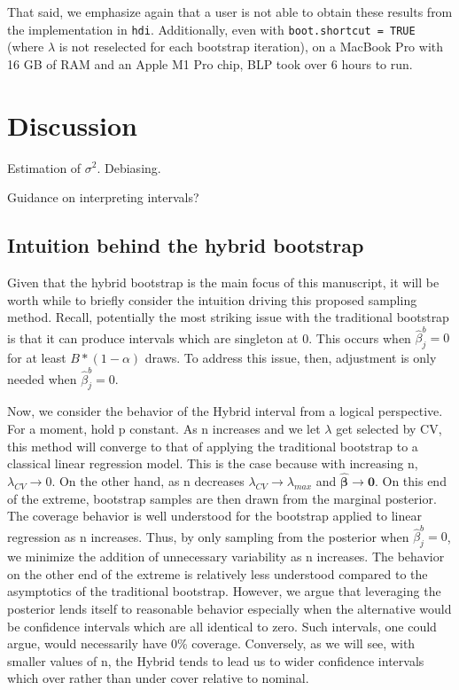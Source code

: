 That said, we emphasize again that a user is not able to obtain these results from the implementation in \texttt{hdi}. Additionally, even with \texttt{boot.shortcut = TRUE} (where $\lambda$ is not reselected for each bootstrap iteration), on a MacBook Pro with 16 GB of RAM and an Apple M1 Pro chip, BLP took over 6 hours to run. 

\section{Discussion}

Estimation of $\sigma^2$. Debiasing.

Guidance on interpreting intervals?

\subsection{Intuition behind the hybrid bootstrap}

Given that the hybrid bootstrap is the main focus of this manuscript, it will be worth while to briefly consider the intuition driving this proposed sampling method. Recall, potentially the most striking issue with the traditional bootstrap is that it can produce intervals which are singleton at 0. This occurs when $\hat{\beta}_j^b = 0$ for at least $B * (1 - \alpha)$ draws. To address this issue, then, adjustment is only needed when $\hat{\beta}_j^{b} = 0$. 

Now, we consider the behavior of the Hybrid interval from a logical perspective. For a moment, hold p constant. As n increases and we let $\lambda$ get selected by CV, this method will converge to that of applying the traditional bootstrap to a classical linear regression model. This is the case because with increasing n, $\lambda_{CV} \rightarrow 0$. On the other hand, as n decreases $\lambda_{CV} \rightarrow \lambda_{max}$ and $\hat{\boldsymbol{\beta}}\rightarrow \boldsymbol{0}$. On this end of the extreme, bootstrap samples are then drawn from the marginal posterior. The coverage behavior is well understood for the bootstrap applied to linear regression as n increases. Thus, by only sampling from the posterior when $\hat{\beta}_j^b = 0$, we minimize the addition of unnecessary variability as n increases. The behavior on the other end of the extreme is relatively less understood compared to the asymptotics of the traditional bootstrap. However, we argue that leveraging the posterior lends itself to reasonable behavior especially when the alternative would be confidence intervals which are all identical to zero. Such intervals, one could argue, would necessarily have 0\% coverage. Conversely, as we will see, with smaller values of n, the Hybrid tends to lead us to wider confidence intervals which over rather than under cover relative to nominal.

